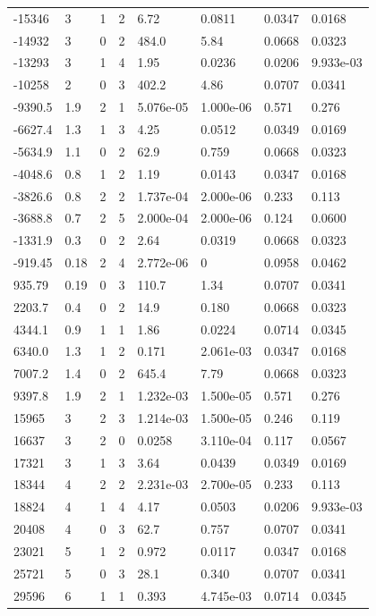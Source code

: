 \documentclass[preview]{standalone}
\begin{document}
{{\begin{tabular}{L{1.2cm}C{1.2cm} C{0.3cm}C{0.5cm} C{1.4cm}C{1.4cm} C{1.4cm}C{1.4cm}}
  -15346  &     3  & 1     &  2 &  6.72  & 0.0811  & 0.0347 &  0.0168   \\ 
  -14932  &     3  & 0     &  2 &  484.0  & 5.84  & 0.0668 &  0.0323   \\ 
  -13293  &     3  & 1     &  4 &  1.95  & 0.0236  & 0.0206 &  9.933e-03   \\ 
  -10258  &     2  & 0     &  3 &  402.2  & 4.86  & 0.0707 &  0.0341   \\ 
  -9390.5  &   1.9  & 2     &  1 &  5.076e-05  & 1.000e-06  & 0.571 &  0.276   \\ 
  -6627.4  &   1.3  & 1     &  3 &  4.25  & 0.0512  & 0.0349 &  0.0169   \\ 
  -5634.9  &   1.1  & 0     &  2 &  62.9  & 0.759  & 0.0668 &  0.0323   \\ 
  -4048.6  &   0.8  & 1     &  2 &  1.19  & 0.0143  & 0.0347 &  0.0168   \\ 
  -3826.6  &   0.8  & 2     &  2 &  1.737e-04  & 2.000e-06  & 0.233 &  0.113   \\ 
  -3688.8  &   0.7  & 2     &  5 &  2.000e-04  & 2.000e-06  & 0.124 &  0.0600   \\ 
  -1331.9  &   0.3  & 0     &  2 &  2.64  & 0.0319  & 0.0668 &  0.0323   \\ 
  -919.45  &  0.18  & 2     &  4 &  2.772e-06  & 0  & 0.0958 &  0.0462   \\ 
  935.79  &  0.19  & 0     &  3 &  110.7  & 1.34  & 0.0707 &  0.0341   \\ 
  2203.7  &   0.4  & 0     &  2 &  14.9  & 0.180  & 0.0668 &  0.0323   \\ 
  4344.1  &   0.9  & 1     &  1 &  1.86  & 0.0224  & 0.0714 &  0.0345   \\ 
  6340.0  &   1.3  & 1     &  2 &  0.171  & 2.061e-03  & 0.0347 &  0.0168   \\ 
  7007.2  &   1.4  & 0     &  2 &  645.4  & 7.79  & 0.0668 &  0.0323   \\ 
  9397.8  &   1.9  & 2     &  1 &  1.232e-03  & 1.500e-05  & 0.571 &  0.276   \\ 
  15965  &     3  & 2     &  3 &  1.214e-03  & 1.500e-05  & 0.246 &  0.119   \\ 
  16637  &     3  & 2     &  0 &  0.0258  & 3.110e-04  & 0.117 &  0.0567   \\ 
  17321  &     3  & 1     &  3 &  3.64  & 0.0439  & 0.0349 &  0.0169   \\ 
  18344  &     4  & 2     &  2 &  2.231e-03  & 2.700e-05  & 0.233 &  0.113   \\ 
  18824  &     4  & 1     &  4 &  4.17  & 0.0503  & 0.0206 &  9.933e-03   \\ 
  20408  &     4  & 0     &  3 &  62.7  & 0.757  & 0.0707 &  0.0341   \\ 
  23021  &     5  & 1     &  2 &  0.972  & 0.0117  & 0.0347 &  0.0168   \\ 
  25721  &     5  & 0     &  3 &  28.1  & 0.340  & 0.0707 &  0.0341   \\ 
  29596  &     6  & 1     &  1 &  0.393  & 4.745e-03  & 0.0714 &  0.0345   \\ 
\hline 
\end{tabular} 

}}
\end{document}
